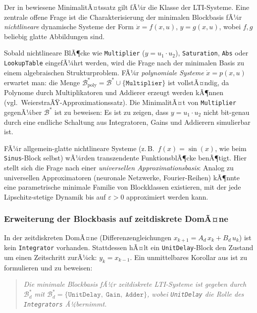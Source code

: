 ﻿\documentclass[12pt,a4paper]{article}
\theoremstyle{definition}
\begin{document}
Der in  bewiesene MinimalitÃ¤tssatz gilt fÃ¼r die Klasse der
LTI-Systeme. Eine zentrale offene Frage ist die Charakterisierung der
minimalen Blockbasis fÃ¼r \emph{nichtlineare} dynamische Systeme der Form
$\dot{x} = f(x, u)$, $y = g(x, u)$, wobei $f, g$ beliebig glatte
Abbildungen sind.

Sobald nichtlineare BlÃ¶cke wie \texttt{Multiplier} ($y = u_1 \cdot u_2$),
\texttt{Saturation}, \texttt{Abs} oder \texttt{LookupTable} eingefÃ¼hrt
werden, wird die Frage nach der minimalen Basis zu einem algebraischen
Strukturproblem. FÃ¼r \emph{polynomiale Systeme} $\dot{x} = p(x, u)$
erwartet man: die Menge
$\mathcal{B}^*_{\mathrm{poly}} = \mathcal{B}^* \cup \{\texttt{Multiplier}\}$
ist vollstÃ¤ndig, da Polynome durch Multiplikatoren und Addierer erzeugt
werden kÃ¶nnen (vgl.\ WeierstraÃŸ-Approximationssatz). Die MinimalitÃ¤t von
\texttt{Multiplier} gegenÃ¼ber $\mathcal{B}^*$ ist zu beweisen: Es ist zu
zeigen, dass $y = u_1 \cdot u_2$ nicht bit-genau durch eine endliche
Schaltung aus Integratoren, Gains und Addierern simulierbar ist.

FÃ¼r allgemein-glatte nichtlineare Systeme (z.\,B.\ $f(x) = \sin(x)$, wie
beim \texttt{Sinus}-Block selbst) wÃ¼rden transzendente FunktionsblÃ¶cke
benÃ¶tigt. Hier stellt sich die Frage nach einer
\emph{universellen Approximationsbasis}: Analog zu universellen
Approximatoren (neuronale Netzwerke, Fourier-Reihen) kÃ¶nnte eine
parametrische minimale Familie von Blockklassen existieren, mit der jede
Lipschitz-stetige Dynamik bis auf $\varepsilon > 0$ approximiert werden kann.

\subsubsection{Erweiterung der Blockbasis auf zeitdiskrete DomÃ¤ne}

In der zeitdiskreten DomÃ¤ne (Differenzengleichungen
$x_{k+1} = A_d\,x_k + B_d\,u_k$) ist kein \texttt{Integrator} vorhanden.
Stattdessen hÃ¤lt ein \texttt{UnitDelay}-Block den Zustand um einen
Zeitschritt zurÃ¼ck: $y_k = x_{k-1}$. Ein unmittelbares Korollar aus
 ist zu formulieren und zu beweisen:

\begin{quote}
\textit{Die minimale Blockbasis fÃ¼r zeitdiskrete LTI-Systeme ist gegeben durch $\mathcal{B}^*_d$ mit $\mathcal{B}^*_d = \{\texttt{UnitDelay},\;\texttt{Gain},\;\texttt{Adder}\}$,
wobei \texttt{UnitDelay} die Rolle des \texttt{Integrators} Ã¼bernimmt.}
\end{quote}
\end{document}
